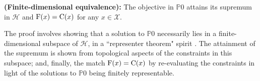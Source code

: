 \begin{theorem}
	 \label{thm.main}
	 {\normalfont \textbf{(Finite-dimensional equivalence):}}
	The objective in $\mathds{P}0$ attains its supremum in $\mathcal{H}$ and ${\normalfont \text{F}}(x) = {\normalfont \text{C}}(x)$ for any $x \in \mathcal{X}$.
\end{theorem}

The proof involves showing that a solution to $\mathds{P}0$ necessarily lies in a finite-dimensional subspace of $\mathcal{H}$, in a ``representer theorem" spirit \citep{scholkopf2001generalized}. The attainment of the supremum is shown from topological aspects of the constraints in this subspace; and, finally, the match ${\normalfont \text{F}}(x) = {\normalfont \text{C}}(x)$ by re-evaluating the constraints in light of the solutions to $\mathds{P}0$ being finitely representable. 

